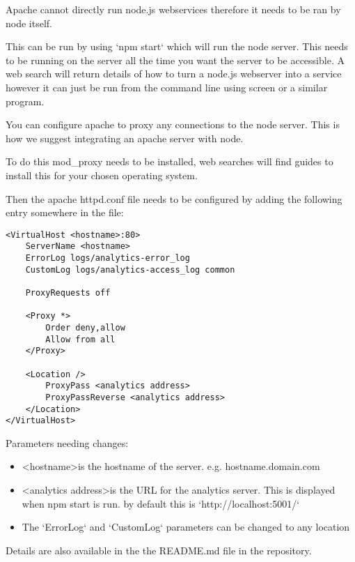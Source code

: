 Apache cannot directly run node.js webservices therefore it needs to be ran by node itself.

This can be run by using `npm start` which will run the node server. This needs to be running on the server all the time you want the server to be accessible.
A web search will return details of how to turn a node.js webserver into a service however it can just be run from the command line using screen or a similar program.

You can configure apache to proxy any connections to the node server. This is how we suggest integrating an apache server with node.

To do this mod\_proxy needs to be installed, web searches will find guides to install this for your chosen operating system.

Then the apache httpd.conf file needs to be configured by adding the following entry somewhere in the file:

\begin{lstlisting}[caption={\label{code:apacheConfig2} Apache configuration}]
<VirtualHost <hostname>:80>
	ServerName <hostname>
	ErrorLog logs/analytics-error_log
	CustomLog logs/analytics-access_log common

	ProxyRequests off
	
	<Proxy *>
		Order deny,allow
		Allow from all
	</Proxy>

	<Location />
		ProxyPass <analytics address>
		ProxyPassReverse <analytics address>
	</Location>
</VirtualHost>
\end{lstlisting}

Parameters needing changes:

\begin{itemize}
\item \textless hostname\textgreater is the hostname of the server. e.g. hostname.domain.com
\item \textless analytics address\textgreater is the URL for the analytics server. This is displayed when npm start is run. by default this is `http://localhost:5001/`
\item The `ErrorLog` and `CustomLog` parameters can be changed to any location
\end{itemize}

Details are also available in the the README.md file in the repository.